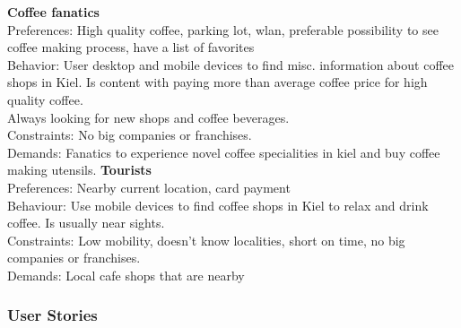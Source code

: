 \textbf{Coffee fanatics}\\
Preferences: High quality coffee, parking lot, wlan, preferable possibility to see coffee making process, have a list of favorites  \\
Behavior: User desktop and mobile devices to find misc. information about coffee shops in Kiel. Is content with paying more than average coffee price for high quality coffee.\\
                 Always looking for new shops and coffee beverages. \\
Constraints: No big companies or franchises. \\
Demands: Fanatics to experience novel coffee specialities in kiel and buy coffee making utensils.\newpage
\textbf{Tourists}\\
Preferences: Nearby current location, card payment \\
Behaviour: Use mobile devices to find coffee shops in Kiel to relax and drink coffee. Is usually near sights. \\
Constraints: Low mobility, doesn't know localities, short on time, no big companies or franchises. \\
Demands: Local cafe shops that are nearby\\

\subsubsection{User Stories}

